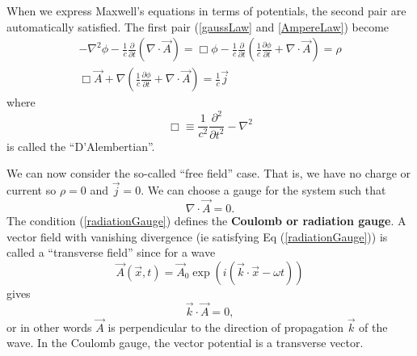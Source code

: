 When we express Maxwell's equations in terms of potentials, the second pair
are automatically satisfied. The first pair (\ref{gaussLaw} and \ref{AmpereLaw}) become
\begin{subequations}
\begin{align}
-\nabla^2\phi - \frac{1}{c}\frac{\partial}{\partial t}(\nabla\cdot\vec{A}) = \Box\phi - \frac{1}{c}\frac{\partial}{\partial t}\left(\frac{1}{c}\frac{\partial\phi}{\partial t} + \nabla\cdot\vec{A}\right) = \rho\\
\Box\vec{A} + \nabla\left(\frac{1}{c}\frac{\partial\phi}{\partial t} + \nabla\cdot\vec{A}\right) = \frac{1}{c}\vec{j}
\end{align}
\end{subequations}
where
\begin{equation}
\Box \equiv \frac{1}{c^2}\frac{\partial^2}{\partial t^2} - \nabla^2
\end{equation}
is called the ``D'Alembertian''.

We can now consider the so-called ``free field'' case. That is, we have no
charge or current so $\rho=0$ and $\vec{j}=0$. We can choose a gauge for the
system such that
\begin{equation}\label{radiationGauge}
\nabla\cdot\vec{A} = 0.
\end{equation}
The condition (\ref{radiationGauge}) defines the \textbf{Coulomb or radiation gauge}. A vector field with vanishing divergence (ie satisfying Eq (\ref{radiationGauge})) is called a ``transverse field'' since for a wave
\begin{equation}
\vec{A}(\vec{x},t) = \vec{A}_0 \exp(i(\vec{k}\cdot\vec{x}-\omega t))
\end{equation}
gives
\begin{equation}
\vec{k}\cdot\vec{A} = 0,
\end{equation}
or in other words $\vec{A}$ is perpendicular to the direction of propagation 
$\vec{k}$ of the wave. In the Coulomb gauge, the vector potential is a transverse
vector.
